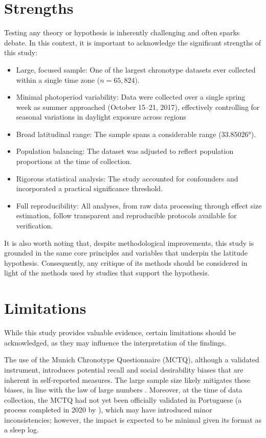 \documentclass[
12pt,
openright,
oneside,
a4paper,
chapter=TITLE,
section=TITLE,
french,
spanish,
brazil,
english
]{abntex2}
\providecommand{\tightlist}{
\setlength{\itemsep}{0ex}\setlength{\parskip}{0\baselineskip}}
\begin{document}
\section{Strengths}\label{strengths}

Testing any theory or hypothesis is inherently challenging and often
sparks debate. In this context, it is important to acknowledge the
significant strengths of this study:

\begin{itemize}
\tightlist
\item
  Large, focused sample: One of the largest chronotype datasets ever
  collected within a single time zone (\(n = 65,824\)).
\item
  Minimal photoperiod variability: Data were collected over a single
  spring week as summer approached (October 15--21, 2017), effectively
  controlling for seasonal variations in daylight exposure across
  regions
\item
  Broad latitudinal range: The sample spans a considerable range
  (\(33.85026°\)).
\item
  Population balancing: The dataset was adjusted to reflect population
  proportions at the time of collection.
\item
  Rigorous statistical analysis: The study accounted for confounders and
  incorporated a practical significance threshold.
\item
  Full reproducibility: All analyses, from raw data processing through
  effect size estimation, follow transparent and reproducible protocols
  available for verification.
\end{itemize}

It is also worth noting that, despite methodological improvements, this
study is grounded in the same core principles and variables that
underpin the latitude hypothesis. Consequently, any critique of its
methods should be considered in light of the methods used by studies
that support the hypothesis.

\section{Limitations}\label{limitations}

While this study provides valuable evidence, certain limitations should
be acknowledged, as they may influence the interpretation of the
findings.

The use of the Munich Chronotype Questionnaire (MCTQ), although a
validated instrument, introduces potential recall and social
desirability biases that are inherent in self-reported measures. The
large sample size likely mitigates these biases, in line with the law of
large numbers \autocite[352]{degroot2012a}. Moreover, at the time of
data collection, the MCTQ had not yet been officially validated in
Portuguese (a process completed in 2020 by \textcite{reis2020a}), which
may have introduced minor inconsistencies; however, the impact is
expected to be minimal given its format as a sleep log.
\end{document}
